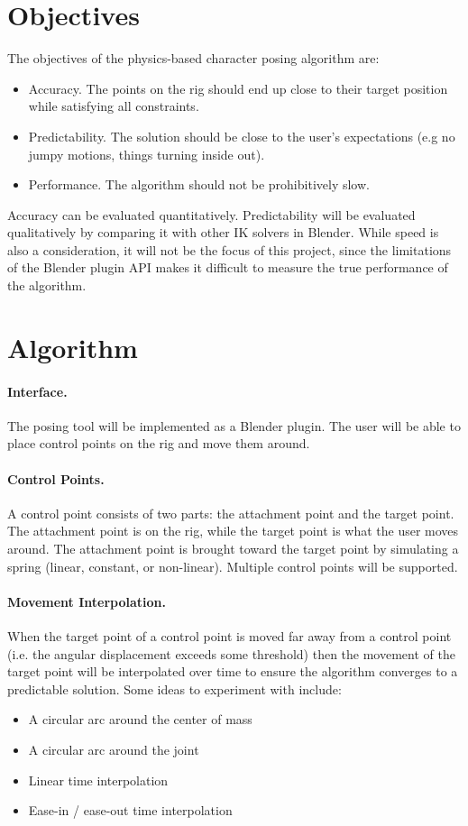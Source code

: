 \documentclass[10pt,twocolumn,letterpaper]{article}
\begin{document}
\section*{Objectives} The objectives of the physics-based character posing algorithm are:
\begin{itemize}
    \item Accuracy. The points on the rig should end up close to their target position while satisfying all constraints.
    \item Predictability. The solution should be close to the user's expectations (e.g no jumpy motions, things turning inside out).
    \item Performance. The algorithm should not be prohibitively slow.
\end{itemize}

Accuracy can be evaluated quantitatively. Predictability will be evaluated qualitatively by comparing it with other IK solvers in Blender. While speed is also a consideration, it will not be the focus of this project, since the limitations of the Blender plugin API makes it difficult to measure the true performance of the algorithm.

\section*{Algorithm}

\paragraph{Interface.} The posing tool will be implemented as a Blender plugin. The user will be able to place control points on the rig and move them around. 

\paragraph{Control Points.} A control point consists of two parts: the attachment point and the target point. The attachment point is on the rig, while the target point is what the user moves around. The attachment point is brought toward the target point by simulating a spring (linear, constant, or non-linear). Multiple control points will be supported.

\paragraph{Movement Interpolation.} When the target point of a control point is moved far away from a control point (i.e. the angular displacement exceeds some threshold) then the movement of the target point will be interpolated over time to ensure the algorithm converges to a predictable solution. Some ideas to experiment with include:
\begin{itemize}
    \item A circular arc around the center of mass
    \item A circular arc around the joint
    \item Linear time interpolation
    \item Ease-in / ease-out time interpolation
\end{itemize}
\end{document}

